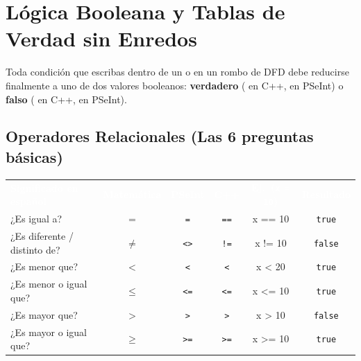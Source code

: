 \documentclass[11pt,letterpaper]{article}
\begin{document}
\section{Lógica Booleana y Tablas de Verdad sin Enredos}

Toda condición que escribas dentro de un  o en un rombo de DFD debe reducirse finalmente a uno de dos valores booleanos: \textbf{verdadero} ( en C++,  en PSeInt) o \textbf{falso} ( en C++,  en PSeInt).

\subsection{Operadores Relacionales (Las 6 preguntas básicas)}

\begin{center}
  \small
  \renewcommand{\arraystretch}{1.28}
  \setlength{\tabcolsep}{4.5pt}
  \begin{tabularx}{\linewidth}{X c c c >{\ttfamily\footnotesize}c c}
    \rowcolor{AzulMarino}
    \textcolor{white}{\textbf{Significado en español}} &
    \textcolor{white}{\textbf{Matemática}} &
    \textcolor{white}{\textbf{PSeInt}} &
    \textcolor{white}{\textbf{C++}} &
    \textcolor{white}{\textbf{\sffamily Ej.\ (\texttt{x = 10})}} &
    \textcolor{white}{\textbf{Resultado}} \\
    ¿Es igual a? & $=$ & \texttt{=} & \texttt{==} & x == 10 & \texttt{true} \\
    ¿Es diferente / distinto de? & $\neq$ & \texttt{<>} & \texttt{!=} & x != 10 & \texttt{false} \\
    ¿Es menor que? & $<$ & \texttt{<} & \texttt{<} & x < 20 & \texttt{true} \\
    ¿Es menor o igual que? & $\le$ & \texttt{<=} & \texttt{<=} & x <= 10 & \texttt{true} \\
    ¿Es mayor que? & $>$ & \texttt{>} & \texttt{>} & x > 10 & \texttt{false} \\
    ¿Es mayor o igual que? & $\ge$ & \texttt{>=} & \texttt{>=} & x >= 10 & \texttt{true} \\
    \bottomrule
  \end{tabularx}
\end{center}
\end{document}
